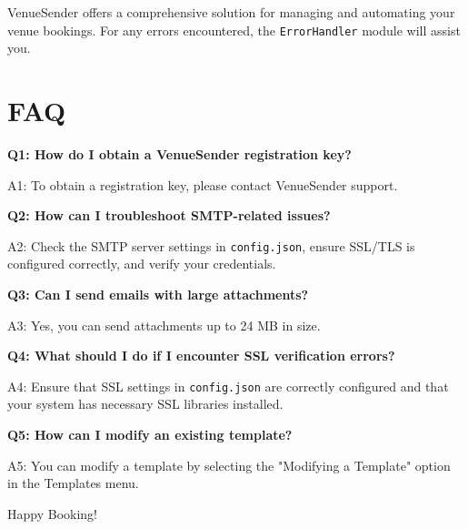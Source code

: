 \documentclass{article}
\begin{document}
	VenueSender offers a comprehensive solution for managing and automating your venue bookings. For any errors encountered, the \texttt{ErrorHandler} module will assist you.
	
	\section{FAQ}
	
	\textbf{Q1: How do I obtain a VenueSender registration key?}
	
	A1: To obtain a registration key, please contact VenueSender support.
	
	\textbf{Q2: How can I troubleshoot SMTP-related issues?}
	
	A2: Check the SMTP server settings in \texttt{config.json}, ensure SSL/TLS is configured correctly, and verify your credentials.
	
	\textbf{Q3: Can I send emails with large attachments?}
	
	A3: Yes, you can send attachments up to 24 MB in size.
	
	\textbf{Q4: What should I do if I encounter SSL verification errors?}
	
	A4: Ensure that SSL settings in \texttt{config.json} are correctly configured and that your system has necessary SSL libraries installed.
	
	\textbf{Q5: How can I modify an existing template?}
	
	A5: You can modify a template by selecting the "Modifying a Template" option in the Templates menu.
	
	Happy Booking!
	
\end{document}
